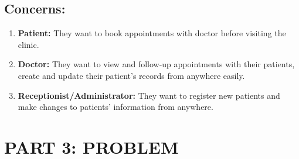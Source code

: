 \documentclass[a4paper,12pt]{report}
\begin{document}
\section*{Concerns:}
\begin{enumerate}
    \item \textbf{Patient:} They want to book appointments with doctor before visiting the clinic.
    \item \textbf{Doctor:} They want to view and follow-up appointments with their patients, create and update their patient's records from anywhere easily.
    \item \textbf{Receptionist/Administrator:} They want to register new patients and make changes to patients' information from anywhere.
\end{enumerate}

\chapter*{PART 3: PROBLEM}
\end{document}
